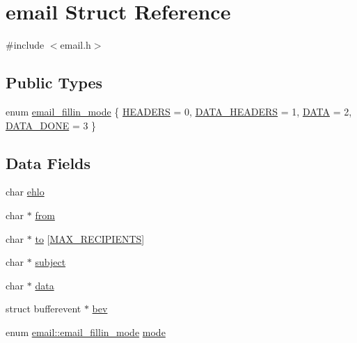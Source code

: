 \hypertarget{structemail}{\section{email Struct Reference}
\label{structemail}
}


{\ttfamily \#include $<$email.\-h$>$}

\subsection*{Public Types}
\begin{DoxyCompactItemize}
\item 
enum \hyperlink{structemail_a9e4fa62032564c26fdeb41bb498463d0}{email\-\_\-fillin\-\_\-mode} \{ \hyperlink{structemail_a9e4fa62032564c26fdeb41bb498463d0ae6c03609bb4f17e56e18c21a49558001}{H\-E\-A\-D\-E\-R\-S} = 0, 
\hyperlink{structemail_a9e4fa62032564c26fdeb41bb498463d0a7280e9a6ff66dd0dfc8858a015f6a3e9}{D\-A\-T\-A\-\_\-\-H\-E\-A\-D\-E\-R\-S} = 1, 
\hyperlink{structemail_a9e4fa62032564c26fdeb41bb498463d0a9d7d6f31868d66330397c967c4afd2d2}{D\-A\-T\-A} = 2, 
\hyperlink{structemail_a9e4fa62032564c26fdeb41bb498463d0aeba86cbe2ebe6c838145a449c14bce86}{D\-A\-T\-A\-\_\-\-D\-O\-N\-E} = 3
 \}
\end{DoxyCompactItemize}
\subsection*{Data Fields}
\begin{DoxyCompactItemize}
\item 
char \hyperlink{structemail_ab6507ffd67fc6059c2aa721b7b8f8f03}{ehlo}
\item 
char $\ast$ \hyperlink{structemail_a765533dfc643627999c751f7e1514664}{from}
\item 
char $\ast$ \hyperlink{structemail_a501cf38e14279529940ea1df44ca4535}{to} \mbox{[}\hyperlink{email_8h_a14de6dbbf65a1bde6916200bf0215c23}{M\-A\-X\-\_\-\-R\-E\-C\-I\-P\-I\-E\-N\-T\-S}\mbox{]}
\item 
char $\ast$ \hyperlink{structemail_ae31ac864419a577c2982907c23b426d3}{subject}
\item 
char $\ast$ \hyperlink{structemail_a91a70b77df95bd8b0830b49a094c2acb}{data}
\item 
struct bufferevent $\ast$ \hyperlink{structemail_a7a6bf7d3dd8ad7622482a90042e470ef}{bev}
\item 
enum \hyperlink{structemail_a9e4fa62032564c26fdeb41bb498463d0}{email\-::email\-\_\-fillin\-\_\-mode} \hyperlink{structemail_aa0332a154778fc4836577a47d37674ae}{mode}
\end{DoxyCompactItemize}


